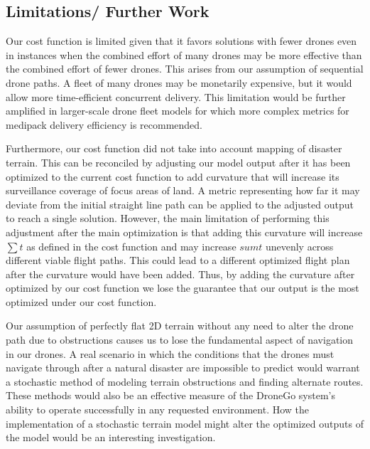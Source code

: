 \documentclass[twocolumn,10pt]{asme2ej}
\begin{document}
\subsection{Limitations/ Further Work}
Our cost function is limited given that it favors solutions with fewer drones even in instances when the combined effort of many drones may be more effective than the combined effort of fewer drones. This arises from our assumption of sequential drone paths. A fleet of many drones may be monetarily expensive, but it would allow more time-efficient concurrent delivery. This limitation would be further amplified in larger-scale drone fleet models for which  more complex metrics for medipack delivery efficiency is recommended.

Furthermore, our cost function did not take into account mapping of disaster terrain. This can be reconciled by adjusting our model output after it has been optimized to the current cost function to add curvature that will increase its surveillance coverage of focus areas of land. A metric representing how far it may deviate from the initial straight line path can be applied to the adjusted output to reach a single solution. However, the main limitation of performing this adjustment after the main optimization is that adding this curvature will increase $\sum{t}$ as defined in the cost function and may increase $sum{t}$ unevenly across different viable flight paths. This could lead to a different optimized flight plan after the curvature would have been added. Thus, by adding the curvature after optimized by our cost function we lose the guarantee that our output is the most optimized under our cost function.

Our assumption of perfectly flat 2D terrain without any need to alter the drone path due to obstructions causes us to lose the fundamental aspect of navigation in our drones. A real scenario in which the conditions that the drones must navigate through after a natural disaster are impossible to predict would warrant a stochastic method of modeling terrain obstructions and finding alternate routes. These methods would also be an effective measure of the DroneGo system's ability to operate successfully in any requested environment. How the implementation of a stochastic terrain model might alter the optimized outputs of the model would be an interesting investigation. 






\end{document}
